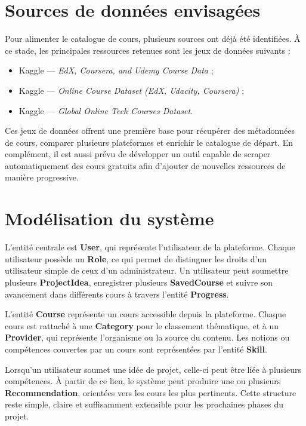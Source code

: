\documentclass[12pt,a4paper]{article}
\begin{document}
\section{Sources de données envisagées}
Pour alimenter le catalogue de cours, plusieurs sources ont déjà été identifiées. À ce stade, les principales ressources retenues sont les jeux de données suivants :

\begin{itemize}
    \item Kaggle --- \textit{EdX, Coursera, and Udemy Course Data} ;
    \item Kaggle --- \textit{Online Course Dataset (EdX, Udacity, Coursera)} ;
    \item Kaggle --- \textit{Global Online Tech Courses Dataset}.
\end{itemize}

Ces jeux de données offrent une première base pour récupérer des métadonnées de cours, comparer plusieurs plateformes et enrichir le catalogue de départ. En complément, il est aussi prévu de développer un outil capable de scraper automatiquement des cours gratuits afin d'ajouter de nouvelles ressources de manière progressive.

\section{Modélisation du système}

L'entité centrale est \textbf{User}, qui représente l'utilisateur de la plateforme. Chaque utilisateur possède un \textbf{Role}, ce qui permet de distinguer les droits d'un utilisateur simple de ceux d'un administrateur. Un utilisateur peut soumettre plusieurs \textbf{ProjectIdea}, enregistrer plusieurs \textbf{SavedCourse} et suivre son avancement dans différents cours à travers l'entité \textbf{Progress}.

L'entité \textbf{Course} représente un cours accessible depuis la plateforme. Chaque cours est rattaché à une \textbf{Category} pour le classement thématique, et à un \textbf{Provider}, qui représente l'organisme ou la source du contenu. Les notions ou compétences couvertes par un cours sont représentées par l'entité \textbf{Skill}.

Lorsqu'un utilisateur soumet une idée de projet, celle-ci peut être liée à plusieurs compétences. À partir de ce lien, le système peut produire une ou plusieurs \textbf{Recommendation}, orientées vers les cours les plus pertinents. Cette structure reste simple, claire et suffisamment extensible pour les prochaines phases du projet.
\end{document}
